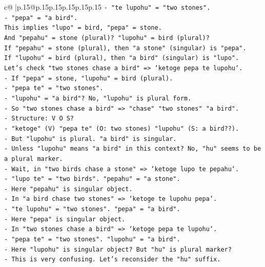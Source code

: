 \documentclass{article}
\begin{document}
{\begin{supertabular}{c@{$\;$}|p{.15\linewidth}@{}p{.15\linewidth}p{.15\linewidth}p{.15\linewidth}p{.15\linewidth}p{.15\linewidth}}
{{{\texttt{{-} "te lupohu" = "two stones".} \\
\texttt{{-} "pepa" = "a bird".} \\
\texttt{This implies "lupo" = bird, "pepa" = stone.} \\
\texttt{And "pepahu" = stone (plural)? "lupohu" = bird (plural)?} \\
\texttt{If "pepahu" = stone (plural), then "a stone" (singular) is "pepa".} \\
\texttt{If "lupohu" = bird (plural), then "a bird" (singular) is "lupo".} \\
\texttt{Let's check "two stones chase a bird" => `ketoge pepa te lupohu`.} \\
\texttt{{-} If "pepa" = stone, "lupohu" = bird (plural).} \\
\texttt{{-} "pepa te" = "two stones".} \\
\texttt{{-} "lupohu" = "a bird"? No, "lupohu" is plural form.} \\
\texttt{{-} So "two stones chase a bird" => "chase" "two stones" "a bird".} \\
\texttt{{-} Structure: V O S?} \\
\texttt{{-} "ketoge" (V) "pepa te" (O: two stones) "lupohu" (S: a bird??).} \\
\texttt{{-} But "lupohu" is plural. "a bird" is singular.} \\
\texttt{{-} Unless "lupohu" means "a bird" in this context? No, "hu" seems to be a plural marker.} \\
\texttt{{-} Wait, in "two birds chase a stone" => `ketoge lupo te pepahu`.} \\
\texttt{{-} "lupo te" = "two birds". "pepahu" = "a stone".} \\
\texttt{{-} Here "pepahu" is singular object.} \\
\texttt{{-} In "a bird chase two stones" => `ketoge te lupohu pepa`.} \\
\texttt{{-} "te lupohu" = "two stones". "pepa" = "a bird".} \\
\texttt{{-} Here "pepa" is singular object.} \\
\texttt{{-} In "two stones chase a bird" => `ketoge pepa te lupohu`.} \\
\texttt{{-} "pepa te" = "two stones". "lupohu" = "a bird".} \\
\texttt{{-} Here "lupohu" is singular object? But "hu" is plural marker?} \\
\texttt{{-} This is very confusing. Let's reconsider the "hu" suffix.} \\
}}}
\end{supertabular}}
\end{document}
